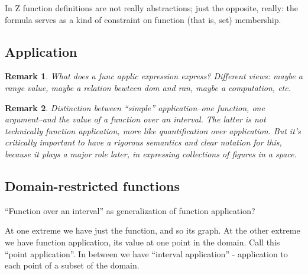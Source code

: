 \documentclass[12pt]{tufte-handout}
\numberwithin{equation}{subsection}
\numberwithin{equation}{subsection}
\newtheorem{remark}{Remark}
\begin{document}
  In Z function definitions are not really abstractions; just the
  opposite, really: the formula serves as a kind of constraint on
  function (that is, set) membership.

  \subsection{Application}
  \label{subs:}

  \begin{remark}
    What does a func applic expression express?  Different views:
    maybe a range value, maybe a relation bewteen dom and ran, maybe a
    computation, etc.
  \end{remark}

  \begin{remark}
    Distinction between ``simple'' application--one function, one
    argument--and the value of a function over an interval.  The
    latter is not technically function application, more like
    quantification over application.  But it's critically important to
    have a rigorous semantics and clear notation for this, because it
    plays a major role later, in expressing collections of figures in
    a space.
  \end{remark}

  \subsection{Domain-restricted functions}
  \label{subs:domrestrfunc}

  ``Function over an interval'' as generalization of function application?

  At one extreme we have just the function, and so its graph.  At the
  other extreme we have function application, its value at one point
  in the domain.  Call this ``point application''.  In between we have
  ``interval application'' - application to each point of a subset of
  the domain.
\end{document}
